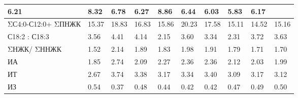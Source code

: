 \begin{table}[]
{\begin{tabular}{|l|lll|lll|lll|}
    \multicolumn{1}{l|}{6.21} &
    \multicolumn{1}{l|}{8.32} &
    6.78 &
    \multicolumn{1}{l|}{6.27} &
    \multicolumn{1}{l|}{8.86} &
    6.44 &
    \multicolumn{1}{l|}{6.03} &
    \multicolumn{1}{l|}{5.83} &
    6.17 \\ \hline
  ΣС4:0-С12:0+   ΣПНЖК &
    \multicolumn{1}{l|}{15.37} &
    \multicolumn{1}{l|}{18.83} &
    16.83 &
    \multicolumn{1}{l|}{15.86} &
    \multicolumn{1}{l|}{20.23} &
    17.58 &
    \multicolumn{1}{l|}{15.11} &
    \multicolumn{1}{l|}{14.52} &
    15.16 \\ \hline
  С18:2 : С18:3 &
    \multicolumn{1}{l|}{3.56} &
    \multicolumn{1}{l|}{4.41} &
    4.14 &
    \multicolumn{1}{l|}{2.15} &
    \multicolumn{1}{l|}{3.60} &
    3.34 &
    \multicolumn{1}{l|}{2.31} &
    \multicolumn{1}{l|}{3.72} &
    3.63 \\ \hline
  ΣНЖК/ ΣННЖК &
    \multicolumn{1}{l|}{1.52} &
    \multicolumn{1}{l|}{2.14} &
    1.89 &
    \multicolumn{1}{l|}{1.83} &
    \multicolumn{1}{l|}{1.98} &
    1.91 &
    \multicolumn{1}{l|}{1.79} &
    \multicolumn{1}{l|}{1.71} &
    1.70 \\ \hline
  ИА &
    \multicolumn{1}{l|}{1.85} &
    \multicolumn{1}{l|}{2.74} &
    2.09 &
    \multicolumn{1}{l|}{2.27} &
    \multicolumn{1}{l|}{2.36} &
    2.36 &
    \multicolumn{1}{l|}{2.12} &
    \multicolumn{1}{l|}{2.03} &
    1.99 \\ \hline
  ИТ &
    \multicolumn{1}{l|}{2.67} &
    \multicolumn{1}{l|}{3.74} &
    3.38 &
    \multicolumn{1}{l|}{3.17} &
    \multicolumn{1}{l|}{3.34} &
    3.40 &
    \multicolumn{1}{l|}{3.09} &
    \multicolumn{1}{l|}{3.17} &
    3.12 \\ \hline
  ИЗ &
    \multicolumn{1}{l|}{0.54} &
    \multicolumn{1}{l|}{0.37} &
    0.48 &
    \multicolumn{1}{l|}{0.44} &
    \multicolumn{1}{l|}{0.42} &
    0.42 &
    \multicolumn{1}{l|}{0.47} &
    \multicolumn{1}{l|}{0.49} &
    0.50 \\ \hline
  \end{tabular}%
  }
\end{table}

